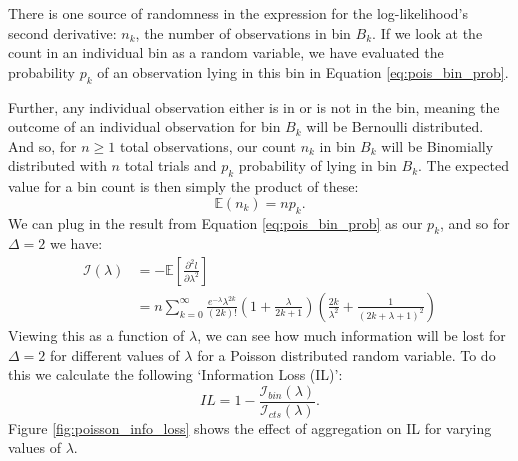 \documentclass[11pt,a4,twosided,singlespacing,titlepagenumber=on,numbers=endperiod]{scrreprt}
\numberwithin{equation}{chapter} %
\theoremstyle{remark}
\begin{document}
There is one source of randomness in the expression for the log-likelihood's second derivative: $n_k$, the number of observations in bin $B_k$. If we look at the count in an individual bin as a random variable, we have evaluated the probability $p_k$ of an observation lying in this bin in Equation \ref{eq:pois_bin_prob}. 

Further, any individual observation either is in or is not in the bin, meaning the outcome of an individual observation for bin $B_k$ will be Bernoulli distributed. And so, for $n\geq1$ total observations, our count $n_k$ in bin $B_k$ will be Binomially distributed with $n$ total trials and $p_k$ probability of lying in bin $B_k$. The expected value for a bin count is then simply the product of these:
\begin{equation}\label{eq:binomial_bin}
	\mathbb{E}(n_k) = n p_k.
\end{equation}
We can plug in the result from Equation \ref{eq:pois_bin_prob} as our $p_k$, and so for $\Delta=2$ we have:
\begin{equation*}
	\begin{aligned}
		\mathcal{I}(\lambda) &= - \mathbb{E}\left[\frac{\partial^2 l}{\partial \lambda^2} \right] \\
		&= n\sum_{k=0}^\infty \frac{e^{-\lambda}\lambda^{2k}}{(2k)!} \left( 1+ \frac{\lambda}{2k+1} \right) \left( \frac{2k}{\lambda^2} + \frac{1}{(2k + \lambda + 1)^2} \right)
	\end{aligned}
\end{equation*}
Viewing this as a function of $\lambda$, we can see how much information will be lost for $\Delta = 2$ for different values of $\lambda$  for a Poisson distributed random variable. To do this we calculate the following `Information Loss (IL)':
\begin{equation}\label{eq:info_loss}
	IL = 1 - \frac{\mathcal{I}_{bin}(\lambda)}{\mathcal{I}_{cts}(\lambda)}.
\end{equation}
Figure \ref{fig:poisson_info_loss} shows the effect of aggregation on IL for varying values of $\lambda$.
\end{document}

